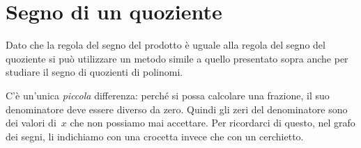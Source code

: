 \section{Segno di un quoziente}
\label{sec:dis_quoziente}

Dato che la regola del segno del prodotto è uguale alla regola del segno del 
quoziente si può utilizzare un metodo simile a quello presentato sopra anche 
per studiare il segno di quozienti di polinomi.

C'è un'unica \emph{piccola} differenza: perché si possa calcolare una frazione, 
il suo denominatore deve essere diverso da zero. Quindi gli zeri del 
denominatore sono dei valori di~$x$ che non possiamo mai accettare. 
Per ricordarci di questo, nel grafo dei segni, li indichiamo con una crocetta 
invece che con un cerchietto.

